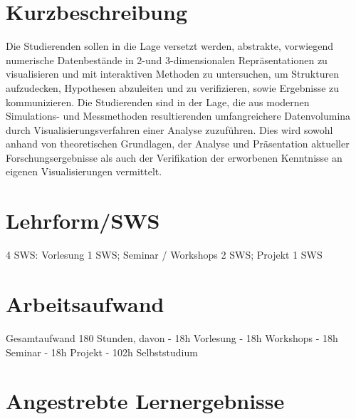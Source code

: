 \section*{Kurzbeschreibung\label{/mi-2017/modulbeschreibungen-master/MA_VC_Modul_Visualisierung}}\label{kurzbeschreibungpathlabelmi-2017modulbeschreibungen-mastermaux5fvcux5fmodulux5fvisualisierung}

Die Studierenden sollen in die Lage versetzt werden, abstrakte,
vorwiegend numerische Datenbestände in 2-und 3-dimensionalen
Repräsentationen zu visualisieren und mit interaktiven Methoden zu
untersuchen, um Strukturen aufzudecken, Hypothesen abzuleiten und zu
verifizieren, sowie Ergebnisse zu kommunizieren. Die Studierenden sind
in der Lage, die aus modernen Simulations- und Messmethoden
resultierenden umfangreichere Datenvolumina durch
Visualisierungsverfahren einer Analyse zuzuführen. Dies wird sowohl
anhand von theoretischen Grundlagen, der Analyse und Präsentation
aktueller Forschungsergebnisse als auch der Verifikation der erworbenen
Kenntnisse an eigenen Visualisierungen vermittelt.

\section*{Lehrform/SWS
\label{/mi-2017/modulbeschreibungen-master/MA_VC_Modul_Visualisierung}}\label{lehrformsws-pathlabelmi-2017modulbeschreibungen-mastermaux5fvcux5fmodulux5fvisualisierung}

4 SWS: Vorlesung 1 SWS; Seminar / Workshops 2 SWS; Projekt 1 SWS

\section*{Arbeitsaufwand
\label{/mi-2017/modulbeschreibungen-master/MA_VC_Modul_Visualisierung}}\label{arbeitsaufwand-pathlabelmi-2017modulbeschreibungen-mastermaux5fvcux5fmodulux5fvisualisierung}

Gesamtaufwand 180 Stunden, davon - 18h Vorlesung - 18h Workshops - 18h
Seminar - 18h Projekt - 102h Selbststudium

\section*{Angestrebte
Lernergebnisse\label{/mi-2017/modulbeschreibungen-master/MA_VC_Modul_Visualisierung}}\label{angestrebte-lernergebnissepathlabelmi-2017modulbeschreibungen-mastermaux5fvcux5fmodulux5fvisualisierung}

